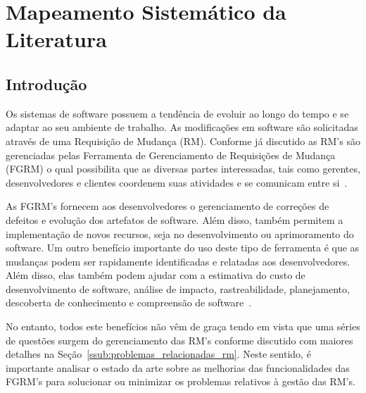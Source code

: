 
\chapter{Mapeamento Sistemático da Literatura}
\label{ch:mapeamento-sistematico}

\section{Introdução}
\label{sec:map-intro}

Os sistemas de software possuem a tendência de evoluir ao longo do tempo e se
adaptar ao seu ambiente de trabalho. As modificações em software são solicitadas
através de uma Requisição de Mudança (RM). Conforme já discutido as RM's são
gerenciadas pelas Ferramenta de Gerenciamento de Requisições de Mudança (FGRM) o
qual possibilita que as diversas partes interessadas, tais como gerentes,
desenvolvedores e clientes coordenem suas atividades e se comunicam entre
si~\cite{bertram2010communication}.

As FGRM's fornecem aos desenvolvedores o gerenciamento de correções de defeitos
e evolução dos artefatos de software. Além disso, também permitem a
implementação de novos recursos, seja no desenvolvimento ou aprimoramento do
software. Um outro benefício importante do uso deste tipo de ferramenta é que as
mudanças podem ser rapidamente identificadas e relatadas aos desenvolvedores.
Além disso, elas também podem ajudar com a estimativa do custo de
desenvolvimento de software, análise de impacto, rastreabilidade, planejamento,
descoberta de conhecimento e compreensão de software~\cite{cavalcanti2013bug}.

No entanto, todos este benefícios não vêm de graça tendo em vista que uma séries
de questões surgem do gerenciamento das RM's conforme discutido com maiores
detalhes na Seção~\ref{ssub:problemas_relacionadas_rm}. Neste sentido, é
importante analisar o estado da arte sobre as melhorias das funcionalidades das
FGRM's para solucionar ou minimizar os problemas relativos à gestão das RM's.

